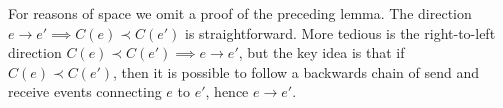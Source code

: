 \documentclass[]             %
{NASA}                       %
\theoremstyle{definition}
\begin{document}
For reasons of space we omit a proof of the preceding lemma.  The
direction $e \to e' \implies C(e) \prec C(e')$ is
straightforward. More tedious is the right-to-left direction
$C(e) \prec C(e') \implies e \to e'$, but the key idea is that if
$C(e) \prec C(e')$, then it is possible to follow a backwards chain of
send and receive events connecting $e$ to $e'$, hence $e \to e'$.










\end{document}
